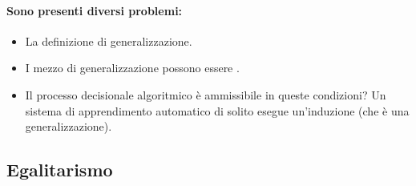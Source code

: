 \paragraph{Sono presenti diversi problemi:}

\begin{itemize}
  \item La definizione di generalizzazione. 
  \item I mezzo di generalizzazione possono essere . 
  \item Il processo decisionale algoritmico è ammissibile in queste condizioni? Un sistema di apprendimento automatico di solito esegue un'induzione (che è una generalizzazione).
\end{itemize}

\subsection{Egalitarismo}










